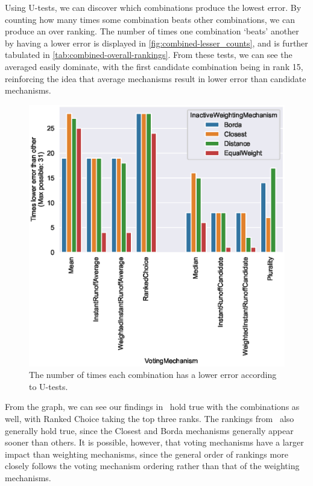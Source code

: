 Using U-tests, we can discover which combinations produce the lowest error.
By counting how many times some combination beats other combinations, we can produce
an over ranking.
The number of times one combination `beats' another by having a lower error is
displayed in \autoref{fig:combined-lesser_counts}, and is further tabulated in
\autoref{tab:combined-overall-rankings}.
From these tests, we can see the averaged easily dominate, with the first candidate
combination being in rank 15, reinforcing the idea that average mechanisms result in
lower error than candidate mechanisms.

\begin{figure}[htbp]
    \centering
    \includegraphics[scale=0.75]
    {./content/figures/combinations/combined_lesser_counts}
    \caption{The number of times each combination has a lower error according to
    U-tests.}
    \label{fig:combined-lesser_counts}
\end{figure}

From the graph, we can see our findings in~
hold true with the combinations as well, with Ranked Choice taking the top three ranks.
The rankings from~ also
generally hold true, since the Closest and Borda mechanisms generally
appear sooner than others.
It is possible, however, that voting mechanisms have a larger impact than weighting
mechanisms, since the general order of rankings more closely follows the voting
mechanism ordering rather than that of the weighting mechanisms.

